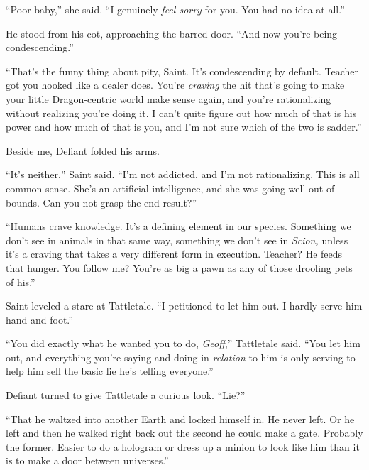 ``Poor baby,'' she said.  ``I genuinely \emph{feel sorry} for you.  You had no idea at all.''



He stood from his cot, approaching the barred door.  ``And now you're being condescending.''



``That's the funny thing about pity, Saint.  It's condescending by default.  Teacher got you hooked like a dealer does.  You're \emph{craving} the hit that's going to make your little Dragon-centric world make sense again, and you're rationalizing without realizing you're doing it.  I can't quite figure out how much of that is his power and how much of that is you, and I'm not sure which of the two is sadder.''



Beside me, Defiant folded his arms.



``It's neither,'' Saint said.  ``I'm not addicted, and I'm not rationalizing.  This is all common sense.  She's an artificial intelligence, and she was going well out of bounds.  Can you not grasp the end result?''



``Humans crave knowledge.  It's a defining element in our species.  Something we don't see in animals in that same way, something we don't see in \emph{Scion, }unless it's a craving that takes a very different form in execution.  Teacher?  He feeds that hunger.  You follow me?  You're as big a pawn as any of those drooling pets of his.''



Saint leveled a stare at Tattletale.  ``I petitioned to let him out.  I hardly serve him hand and foot.''



``You did exactly what he wanted you to do, \emph{Geoff},'' Tattletale said.  ``You let him out, and everything you're saying and doing in \emph{relation} to him is only serving to help him sell the basic lie he's telling everyone.''



Defiant turned to give Tattletale a curious look.  ``Lie?''



``That he waltzed into another Earth and locked himself in.  He never left.  Or he left and then he walked right back out the second he could make a gate.  Probably the former.  Easier to do a hologram or dress up a minion to look like him than it is to make a door between universes.''



